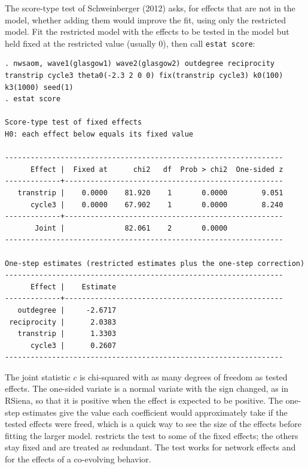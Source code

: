 The score-type test of Schweinberger (2012) asks, for effects that are not in the model, whether adding them would improve the fit, using only the restricted model. Fit the restricted model with the effects to be tested in the model but held fixed at the restricted value (usually 0), then call \texttt{estat score}:
\begin{lstlisting}
. nwsaom, wave1(glasgow1) wave2(glasgow2) outdegree reciprocity transtrip cycle3 theta0(-2.3 2 0 0) fix(transtrip cycle3) k0(100) k3(1000) seed(1)
. estat score

Score-type test of fixed effects
H0: each effect below equals its fixed value

-----------------------------------------------------------------
      Effect |  Fixed at      chi2   df  Prob > chi2  One-sided z
-------------+---------------------------------------------------
   transtrip |    0.0000    81.920    1       0.0000        9.051
      cycle3 |    0.0000    67.902    1       0.0000        8.240
-------------+---------------------------------------------------
       Joint |              82.061    2       0.0000
-----------------------------------------------------------------

One-step estimates (restricted estimates plus the one-step correction)
-----------------------------------------------------------------
      Effect |    Estimate
-------------+---------------------------------------------------
   outdegree |     -2.6717
 reciprocity |      2.0383
   transtrip |      1.3303
      cycle3 |      0.2607
-----------------------------------------------------------------
\end{lstlisting}
The joint statistic $c$ is chi-squared with as many degrees of freedom as tested effects. The one-sided variate is a normal variate with the sign changed, as in RSiena, so that it is positive when the effect is expected to be positive. The one-step estimates give the value each coefficient would approximately take if the tested effects were freed, which is a quick way to see the size of the effects before fitting the larger model.  restricts the test to some of the fixed effects; the others stay fixed and are treated as redundant. The test works for network effects and for the effects of a co-evolving behavior.

